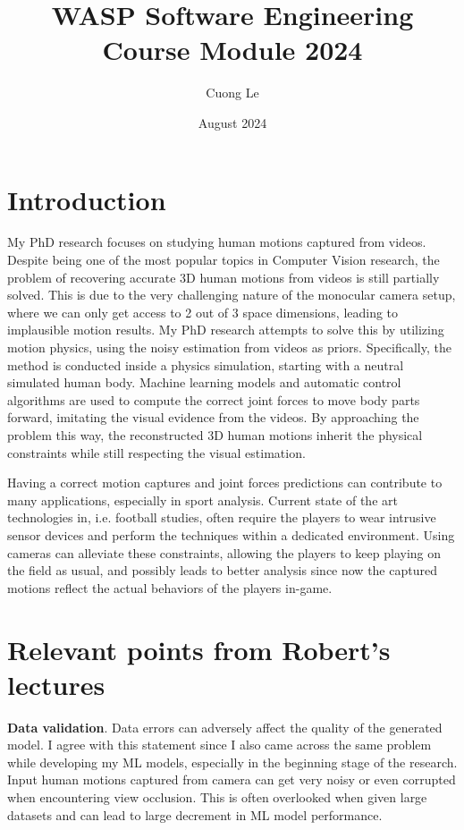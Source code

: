 \documentclass{article}
\title{WASP Software Engineering Course Module 2024}
\author{Cuong Le}
\date{August 2024}
\begin{document}
\maketitle

\vspace{-25pt}
\section{Introduction}

My PhD research focuses on studying human motions captured from videos. Despite being one of the most popular topics in Computer Vision research, the problem of recovering accurate 3D human motions from videos is still partially solved. This is due to the very challenging nature of the monocular camera setup, where we can only get access to 2 out of 3 space dimensions, leading to implausible motion results. My PhD research attempts to solve this by utilizing motion physics, using the noisy estimation from videos as priors. Specifically, the method is conducted inside a physics simulation, starting with a neutral simulated human body. Machine learning models and automatic control algorithms are used to compute the correct joint forces to move body parts forward, imitating the visual evidence from the videos. By approaching the problem this way, the reconstructed 3D human motions inherit the physical constraints while still respecting the visual estimation.

Having a correct motion captures and joint forces predictions can contribute to many applications, especially in sport analysis. Current state of the art technologies in, i.e. football studies, often require the players to wear intrusive sensor devices and perform the techniques within a dedicated environment. Using cameras can alleviate these constraints, allowing the players to keep playing on the field as usual, and possibly leads to better analysis since now the captured motions reflect the actual behaviors of the players in-game.

\section{Relevant points from Robert's lectures}

\textbf{Data validation}. Data errors can adversely affect the quality of the generated model. I agree with this statement since I also came across the same problem while developing my ML models, especially in the beginning stage of the research. Input human motions captured from camera can get very noisy or even corrupted when encountering view occlusion. This is often overlooked when given large datasets and can lead to large decrement in ML model performance.
\end{document}
